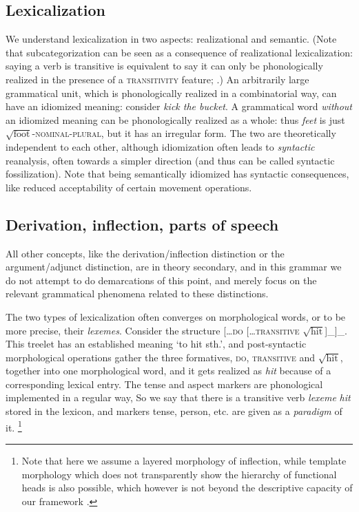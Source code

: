 \documentclass[UTF8, a4paper, oneside, scheme=plain, 12pt]{ctexrep}
\newcommand*{\term}[1]{\emph{#1}}
\newcommand{\form}[1]{\emph{#1}}
\newcommand{\translate}[1]{`#1'}
\newcommand*{\category}[1]{\textsc{#1}}
\newcommand*{\wordroot}[1]{$\sqrt{\text{#1}}$}
\begin{document}
{\subsection{Lexicalization}\label{sec:intro.theory.lexicon}

We understand lexicalization in two aspects:
realizational and semantic.
(Note that subcategorization can be seen as a consequence of realizational lexicalization:
saying a verb is transitive is equivalent to say it can only be phonologically realized
in the presence of a \category{transitivity} feature; \citealt{siddiqi2009syntax}.)
An arbitrarily large grammatical unit,
which is phonologically realized in a combinatorial way, can have an idiomized meaning:
consider \form{kick the bucket}.
A grammatical word \emph{without} an idiomized meaning
can be phonologically realized as a whole:
thus \form{feet} is just \wordroot{foot}-\category{nominal}-\category{plural},
but it has an irregular form.
The two are theoretically independent to each other,
although idiomization often leads to \emph{syntactic} reanalysis,
often towards a simpler direction (and thus can be called syntactic fossilization). 
Note that being semantically idiomized has syntactic consequences,
like reduced acceptability of certain movement operations.

\subsection{Derivation, inflection, parts of speech}

All other concepts, like the derivation/inflection distinction
or the argument/adjunct distinction, are in theory secondary,
and in this grammar we do not attempt to do demarcations of this point,
and merely focus on the relevant grammatical phenomena related to these distinctions.

The two types of lexicalization often converges on morphological words,
or to be more precise, their \emph{lexemes}.
Consider the structure [\dots \category{do} [\dots \category{transitive} \wordroot{hit}]_{}]_{}.
This treelet has an established meaning \translate{to hit sth.},
and post-syntactic morphological operations gather the three formatives,
\category{do}, \category{transitive} and \wordroot{hit}, together into one morphological word,
and it gets realized as \form{hit} because of a corresponding lexical entry.
The tense and aspect markers are phonological implemented in a regular way,
So we say that there is a transitive verb \term{lexeme} \form{hit} stored in the lexicon,
and markers tense, person, etc. are given as a \term{paradigm} of it.%
\footnote{
    Note that here we assume a layered morphology of inflection,
    while template morphology which does not transparently show the hierarchy of functional heads
    is also possible, which however is not beyond the descriptive capacity of our framework
    \citep{bye2020morpheme}.
}

}
\end{document}

